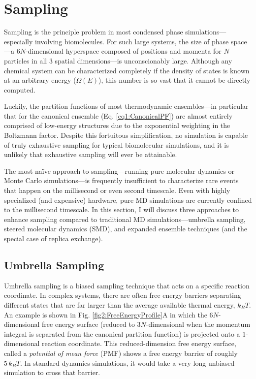 \section{Sampling}

Sampling is the principle problem in most condensed phase
simulations---especially involving biomolecules. For such large systems, the
size of phase space---a $6N$-dimensional hyperspace composed of positions and
momenta for $N$ particles in all 3 spatial dimensions---is unconscionably large.
Although any chemical system can be characterized completely if the density of
states is known at an arbitrary energy ($\Omega(E)$), this number is so vast
that it cannot be directly computed.

Luckily, the partition functions of most thermodynamic ensembles---in particular
that for the canonical ensemble (Eq. \ref{eq1:CanonicalPF}) are almost
entirely comprised of low-energy structures due to the exponential weighting in
the Boltzmann factor. Despite this fortuitous simplification, no simulation is
capable of truly exhaustive sampling for typical biomolecular simulations, and
it is unlikely that exhaustive sampling will ever be attainable. 

The most na\"ive approach to sampling---running pure molecular dynamics or Monte
Carlo simulations---is frequently insufficient to characterize rare events that
happen on the millisecond or even second timescale. Even with highly specialized
(and expensive) hardware, pure MD simulations are currently confined to the
millisecond timescale. \cite{Shaw2010} In this section, I will discuss three
approaches to enhance sampling compared to traditional MD simulations---umbrella
sampling, steered molecular dynamics (SMD), and expanded ensemble techniques
(and the special case of replica exchange).

\subsection{Umbrella Sampling}

Umbrella sampling is a biased sampling technique that acts on a specific
reaction coordinate. In complex systems, there are often free energy barriers
separating different states that are far larger than the average available
thermal energy, $k_BT$. An example is shown in Fig.
\ref{fig2:FreeEnergyProfile}A in which the $6N$-dimensional free energy surface
(reduced to $3N$-dimensional when the momentum integral is separated from the
canonical partition function) is projected onto a 1-dimensional reaction
coordinate. This reduced-dimension free energy surface, called a \emph{potential
of mean force} (PMF) shows a free energy barrier of roughly $5\,k_BT$. In
standard dynamics simulations, it would take a very long unbiased simulation to
cross that barrier.

